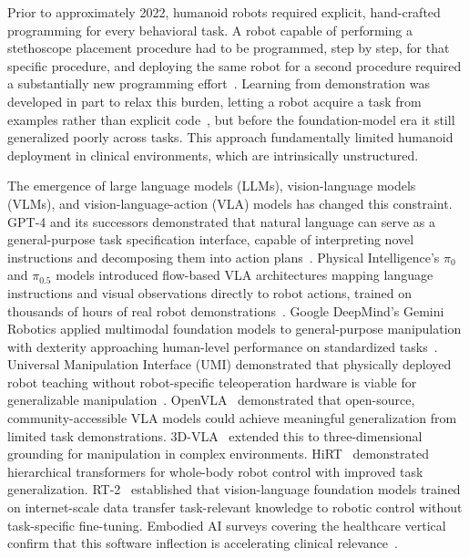 \documentclass[acmsmall]{acmart}
\begin{document}
Prior to approximately 2022, humanoid robots required explicit, hand-crafted
programming for every behavioral task.
A robot capable of performing a
stethoscope placement procedure had to be programmed, step by step, for that
specific procedure, and deploying the same robot for a second procedure required
a substantially new programming effort~\cite{billard2008robot,schaal1999imitation}.
Learning from demonstration was developed in part to relax this burden, letting a
robot acquire a task from examples rather than explicit
code~\cite{argall2009survey,ravichandar2020recent}, but before the foundation-model
era it still generalized poorly across tasks. This approach fundamentally limited
humanoid deployment in clinical environments, which are intrinsically
unstructured.

The emergence of large language models (LLMs), vision-language models (VLMs), and
vision-language-action (VLA) models has changed this constraint.
GPT-4 and its successors demonstrated that natural language can serve as a
general-purpose task specification interface, capable of interpreting novel
instructions and decomposing them into action plans~\cite{openai2023gpt4}.
Physical Intelligence's $\pi_0$ and $\pi_{0.5}$ models introduced flow-based
VLA architectures mapping language instructions and visual observations directly
to robot actions, trained on thousands of hours of real robot
demonstrations~\cite{black2024pi0}. Google DeepMind's Gemini Robotics applied
multimodal foundation models to general-purpose manipulation with dexterity
approaching human-level performance on standardized
tasks~\cite{geminiroboticsTeam2025}. Universal Manipulation Interface (UMI)
demonstrated that physically deployed robot teaching without robot-specific
teleoperation hardware is viable for generalizable
manipulation~\cite{chi2024umi}. OpenVLA~\cite{kim2024openvla} demonstrated
that open-source, community-accessible VLA models could achieve meaningful
generalization from limited task demonstrations. 3D-VLA~\cite{zhen20243dvla}
extended this to three-dimensional grounding for manipulation in complex
environments. HiRT~\cite{wen2024hirt} demonstrated hierarchical transformers
for whole-body robot control with improved task generalization. RT-2~\cite{brohan2023rt2}
established that vision-language foundation models trained on internet-scale
data transfer task-relevant knowledge to robotic control without task-specific
fine-tuning. Embodied AI surveys covering the healthcare vertical confirm that
this software inflection is accelerating clinical
relevance~\cite{liu2025screens,mir2026embodied,lisondra2026embodied}.
\end{document}
